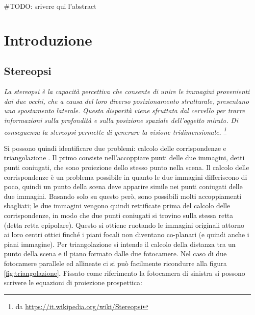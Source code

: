 \documentclass[12pt]{report}
\newcommand{\nullpage}{\newpage\null\thispagestyle{empty}}
\begin{document}
	\#TODO: srivere qui l'abstract
	

	\nullpage						%
	\tableofcontents				%
	\nullpage						%

	\renewcommand{\thepage}{\arabic{page}} %
	\setcounter{page}{1}                   %


	\chapter{Introduzione}
	\label{sec:Introduzione}
	\pagestyle{fancy}
	
		\section{Stereopsi}
		\label{sec:Stereopsi}
			\textit{
			La stereopsi è la capacità percettiva che consente di unire le immagini provenienti dai due occhi, che a causa del loro diverso posizionamento strutturale, presentano uno spostamento laterale. Questa disparità viene sfruttata dal cervello per trarre informazioni sulla profondità e sulla posizione spaziale dell'oggetto mirato. Di conseguenza la stereopsi permette di generare la visione tridimensionale. \footnote{da \url{https://it.wikipedia.org/wiki/Stereopsi}} \newline}
			
			Si possono quindi identificare due problemi: calcolo delle corrispondenze e triangolazione \cite{fusiello}.\newline
			Il primo consiste nell'accoppiare punti delle due immagini, detti punti coniugati, che sono proiezione dello stesso punto nella scena. Il calcolo delle corrispondenze è un problema possibile in quanto le due immagini differiscono di poco, quindi un punto della scena deve apparire simile nei punti coniugati delle due immagini. Basando solo su questo però, sono possibili molti accoppiamenti sbagliati; le due immagini vengono quindi rettificate prima del calcolo delle corrispondenze, in modo che due punti coniugati si trovino sulla stessa retta (detta retta epipolare). Questo si ottiene ruotando le immagini originali attorno ai loro centri ottici finché i piani 
			focali non diventano co-planari (e quindi anche i piani immagine).\newline
			Per triangolazione si intende il calcolo della distanza tra un punto della scena e il piano formato dalle due fotocamere. Nel caso di due fotocamere parallele ed allineate ci si può facilmente ricondurre alla figura \ref{fig:triangolazione}.
			Fissato come riferimento la fotocamera di sinistra si possono scrivere le equazioni di proiezione prospettica:
			
\end{document}

